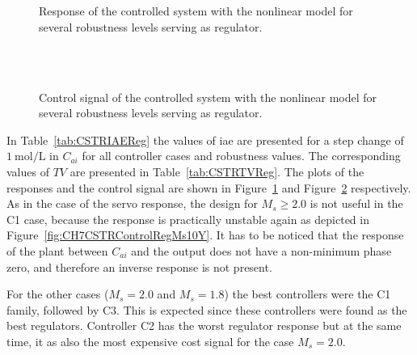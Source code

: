 %
\begin{figure}
	\centering
	\\
	\\
	\caption{Response of the controlled system with the nonlinear model for several robustness levels serving as regulator.}
	\label{fig:CH7CSTRControlRegY}
\end{figure}
%
%
\begin{figure}
	\centering
	\\
	\\
	\caption{Control signal of the controlled system with the nonlinear model for several robustness levels serving as regulator.}
	\label{fig:CH7CSTRControlRegU}
\end{figure}
%
In Table~\ref{tab:CSTRIAEReg} the values of \gls{iae} are presented for a step change of $\SI{1}{\mole\per\liter}$ in $C_{ai}$ for all controller cases and robustness values. The corresponding values of $TV$ are presented in Table~\ref{tab:CSTRTVReg}. The plots of the responses and the control signal are shown in Figure~\ref{fig:CH7CSTRControlRegY} and Figure~\ref{fig:CH7CSTRControlRegU} respectively. As in the case of the servo response, the design for $M_s \geq 2.0$ is not useful in the C1 case, because the response is practically unstable again as depicted in Figure~\ref{fig:CH7CSTRControlRegMs10Y}. It has to be noticed that the response of the plant between $C_{ai}$ and the output does not have a non-minimum phase zero, and therefore an inverse response is not present.

For the other cases ($M_s = 2.0$ and $M_s = 1.8$) the best controllers were the C1 family, followed by C3. This is expected since these controllers were found as the best regulators. Controller C2 has the worst regulator response but at the same time, it as also the most expensive cost signal for the case $M_s = 2.0$.

